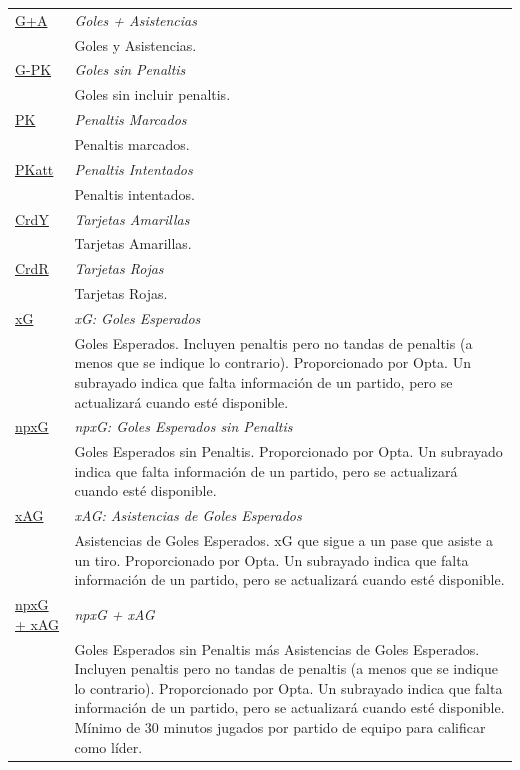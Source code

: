 \documentclass[a4paper,11pt]{article}
\theoremstyle{definition}
\begin{document}
\begin{longtable}{|l|p{12cm}|}
        \hyperlink{tooltip:G+A}{G+A} & \textit{Goles + Asistencias} \\
        & Goles y Asistencias. \\
        \hline
        \hyperlink{tooltip:G-PK}{G-PK} & \textit{Goles sin Penaltis} \\
        & Goles sin incluir penaltis. \\
        \hline
        \hyperlink{tooltip:PK}{PK} & \textit{Penaltis Marcados} \\
        & Penaltis marcados. \\
        \hline
        \hyperlink{tooltip:PKatt}{PKatt} & \textit{Penaltis Intentados} \\
        & Penaltis intentados. \\
        \hline
        \hyperlink{tooltip:CrdY}{CrdY} & \textit{Tarjetas Amarillas} \\
        & Tarjetas Amarillas. \\
        \hline
        \hyperlink{tooltip:CrdR}{CrdR} & \textit{Tarjetas Rojas} \\
        & Tarjetas Rojas. \\
        \hline
        \hyperlink{tooltip:xG}{xG} & \textit{xG: Goles Esperados} \\
        & Goles Esperados. Incluyen penaltis pero no tandas de penaltis (a menos que se indique lo contrario). Proporcionado por Opta. Un subrayado indica que falta información de un partido, pero se actualizará cuando esté disponible. \\
        \hline
        \hyperlink{tooltip:npxG}{npxG} & \textit{npxG: Goles Esperados sin Penaltis} \\
        & Goles Esperados sin Penaltis. Proporcionado por Opta. Un subrayado indica que falta información de un partido, pero se actualizará cuando esté disponible. \\
        \hline
        \hyperlink{tooltip:xAG}{xAG} & \textit{xAG: Asistencias de Goles Esperados} \\
        & Asistencias de Goles Esperados. xG que sigue a un pase que asiste a un tiro. Proporcionado por Opta. Un subrayado indica que falta información de un partido, pero se actualizará cuando esté disponible. \\
        \hline
        \hyperlink{tooltip:npxG+xAG}{npxG + xAG} & \textit{npxG + xAG} \\
        & Goles Esperados sin Penaltis más Asistencias de Goles Esperados. Incluyen penaltis pero no tandas de penaltis (a menos que se indique lo contrario). Proporcionado por Opta. Un subrayado indica que falta información de un partido, pero se actualizará cuando esté disponible. Mínimo de 30 minutos jugados por partido de equipo para calificar como líder. \\

\end{longtable}
\end{document}
